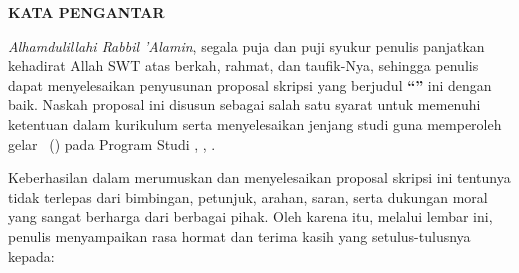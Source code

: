 
\clearpage
{}
\pagestyle{frontstyle}

\begin{center}
    {\fontsize{14pt}{18pt}\selectfont \bfseries KATA PENGANTAR}
\end{center}

\vspace{0.3cm}

\textit{Alhamdulillahi Rabbil ’Alamin}, segala puja dan puji syukur penulis panjatkan kehadirat Allah SWT atas berkah, rahmat, dan taufik-Nya, sehingga penulis dapat menyelesaikan penyusunan proposal skripsi yang berjudul \textbf{“\skripsiJudul”} ini dengan baik. Naskah proposal ini disusun sebagai salah satu syarat untuk memenuhi ketentuan dalam kurikulum serta menyelesaikan jenjang studi guna memperoleh gelar \skripsiGelar\ (\skripsiSingkatanGelar) pada Program Studi \skripsiProdi, \skripsiFakultas, \skripsiUniversitas.

Keberhasilan dalam merumuskan dan menyelesaikan proposal skripsi ini tentunya tidak terlepas dari bimbingan, petunjuk, arahan, saran, serta dukungan moral yang sangat berharga dari berbagai pihak. Oleh karena itu, melalui lembar ini, penulis menyampaikan rasa hormat dan terima kasih yang setulus-tulusnya kepada:

